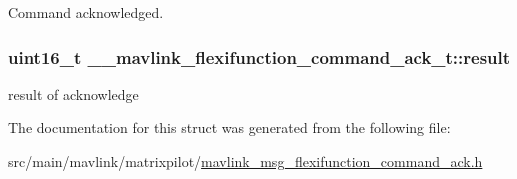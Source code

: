 Command acknowledged. 

\hypertarget{struct____mavlink__flexifunction__command__ack__t_afe2b444356de2f5e2d3e7ddaad45d4c8}{
\subsubsection[{result}]{\setlength{\rightskip}{0pt plus 5cm}uint16\+\_\+t \+\_\+\+\_\+mavlink\+\_\+flexifunction\+\_\+command\+\_\+ack\+\_\+t\+::result}}\label{struct____mavlink__flexifunction__command__ack__t_afe2b444356de2f5e2d3e7ddaad45d4c8}


result of acknowledge 



The documentation for this struct was generated from the following file\+:\begin{DoxyCompactItemize}
\item 
src/main/mavlink/matrixpilot/\hyperlink{mavlink__msg__flexifunction__command__ack_8h}{mavlink\+\_\+msg\+\_\+flexifunction\+\_\+command\+\_\+ack.\+h}\end{DoxyCompactItemize}
